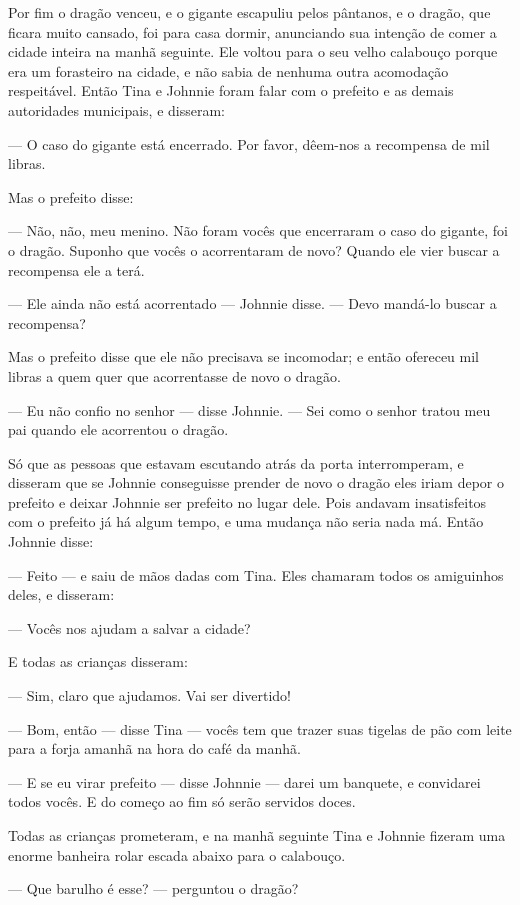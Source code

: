 Por fim o dragão venceu, e o gigante escapuliu pelos pântanos, e o
dragão, que ficara muito cansado, foi para casa dormir, anunciando
sua intenção de comer a cidade inteira na manhã seguinte. Ele voltou
para o seu velho calabouço porque era um forasteiro na cidade, e não
sabia de nenhuma outra acomodação respeitável. Então Tina e Johnnie
foram falar com o prefeito e as demais autoridades municipais, e
disseram:

— O caso do gigante está encerrado. Por favor, dêem-nos a recompensa
de mil libras.

Mas o prefeito disse:

— Não, não, meu menino. Não foram vocês que encerraram o caso do
gigante, foi o dragão. Suponho que vocês o acorrentaram de novo?
Quando ele vier buscar a recompensa ele a terá. 

— Ele ainda não está acorrentado — Johnnie disse. — Devo mandá-lo
buscar a recompensa?

Mas o prefeito disse que ele não precisava se incomodar; e então
ofereceu mil libras a quem quer que acorrentasse de novo o dragão.

— Eu não confio no senhor — disse Johnnie. — Sei como o senhor tratou
meu pai quando ele acorrentou o dragão.

Só que as pessoas que estavam escutando atrás da porta interromperam,
e disseram que se Johnnie conseguisse prender de novo o dragão eles
iriam depor o prefeito e deixar Johnnie ser prefeito no lugar dele.
Pois andavam insatisfeitos com o prefeito já há algum tempo, e uma
mudança não seria nada má. Então Johnnie disse:

— Feito — e saiu de mãos dadas com Tina. Eles chamaram todos os
amiguinhos deles, e disseram:

— Vocês nos ajudam a salvar a cidade?

E todas as crianças disseram:

— Sim, claro que ajudamos. Vai ser divertido!

— Bom, então — disse Tina — vocês tem que trazer suas tigelas de pão
com leite para a forja amanhã na hora do café da manhã.

— E se eu virar prefeito — disse Johnnie — darei um banquete, e
convidarei todos vocês. E do começo ao fim só serão servidos doces.

Todas as crianças prometeram, e na manhã seguinte Tina e Johnnie
fizeram uma enorme banheira rolar escada abaixo para o calabouço.

— Que barulho é esse? — perguntou o dragão?

